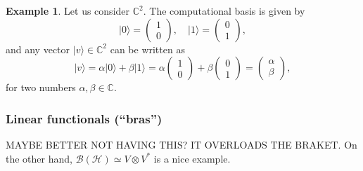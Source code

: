 \documentclass{article}
\theoremstyle{definition}
\newtheorem{example}{Example}
\newcommand{\ket}[1]{\vert #1 \rangle}
\begin{document}
\begin{example}
  Let us consider $\mathbb{C}^2$. The computational basis is given by
  \begin{equation*}
    \ket{0} = \begin{pmatrix} 1 \\ 0 \end{pmatrix}, \quad 
    \ket{1} = \begin{pmatrix} 0 \\ 1 \end{pmatrix},
  \end{equation*}
   and any vector $\ket{v}\in\mathbb{C}^2$ can be written as
   \begin{equation*}
     \ket{v} = \alpha \ket{0} + \beta \ket{1} = \alpha \begin{pmatrix} 1 \\ 0 \end{pmatrix} + \beta \begin{pmatrix} 0 \\ 1 \end{pmatrix} = \begin{pmatrix} \alpha \\ \beta \end{pmatrix},
   \end{equation*}
   for two numbers $\alpha,\beta\in\mathbb{C}$.
\end{example}

\subsubsection{Linear functionals (``bras'')}

{\color{red} MAYBE BETTER NOT HAVING THIS? IT OVERLOADS THE BRAKET.
On the other hand, $\mathcal{B}(\mathcal{H}) \simeq V\otimes V^*$ is a nice example.}
\end{document}
